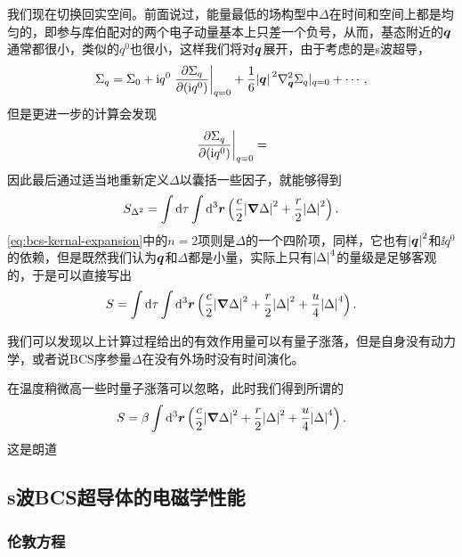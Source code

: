 我们现在切换回实空间。前面说过，能量最低的场构型中$\Delta$在时间和空间上都是均匀的，即参与库伯配对的两个电子动量基本上只差一个负号，从而，基态附近的$\vb*{q}$通常都很小，类似的$q^0$也很小，这样我们将对$\vb*{q}$展开，由于考虑的是s波超导，
\[
    \Sigma_{q} = \Sigma_{0} + \ii q^0 \eval{\pdv{\Sigma_{q}}{(\ii q^0)}}_{q=0} + \frac{1}{6} \abs*{\vb*{q}}^2 \laplacian_{\vb*{q}} \Sigma_{q} |_{q=0} + \cdots,
\]
但是更进一步的计算会发现
\[
    \eval{\pdv{\Sigma_{q}}{(\ii q^0)}}_{q=0} = 
\]
因此最后通过适当地重新定义$\Delta$以囊括一些因子，就能够得到
\begin{equation}
    S_{\Delta^2} = \int \dd{\tau} \int \dd[3]{\vb*{r}} \left( \frac{c}{2} \abs{\grad{\Delta}}^2 + \frac{r}{2} \abs{\Delta}^2 \right).
\end{equation}
\eqref{eq:bcs-kernal-expansion}中的$n=2$项则是$\Delta$的一个四阶项，同样，它也有$\abs{\vb*{q}}^2$和$\ii q^0$的依赖，但是既然我们认为$\vb*{q}$和$\Delta$都是小量，实际上只有$\abs{\Delta}^4$的量级是足够客观的，于是可以直接写出
\begin{equation}
    S = \int \dd{\tau} \int \dd[3]{\vb*{r}} \left( \frac{c}{2} \abs{\grad{\Delta}}^2 + \frac{r}{2} \abs{\Delta}^2 + \frac{u}{4} \abs{\Delta}^4 \right).
    \label{eq:bcs-copper-theory}
\end{equation}

我们可以发现以上计算过程给出的有效作用量可以有量子涨落，但是自身没有动力学，或者说BCS序参量$\Delta$在没有外场时没有时间演化。

在温度稍微高一些时量子涨落可以忽略，此时我们得到所谓的
\begin{equation}
    S = \beta \int \dd[3]{\vb*{r}} \left( \frac{c}{2} \abs{\grad{\Delta}}^2 + \frac{r}{2} \abs{\Delta}^2 + \frac{u}{4} \abs{\Delta}^4 \right).
\end{equation}
这是朗道

\subsection{s波BCS超导体的电磁学性能}

\subsubsection{伦敦方程}

